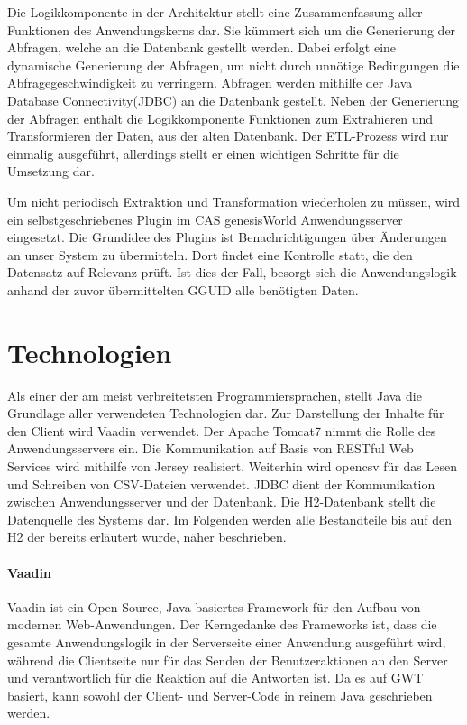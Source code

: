 Die Logikkomponente in der Architektur stellt eine Zusammenfassung aller Funktionen des Anwendungskerns dar. Sie kümmert sich um die Generierung der Abfragen, welche an die Datenbank gestellt werden. Dabei erfolgt eine dynamische Generierung der Abfragen, um nicht durch unnötige Bedingungen die Abfragegeschwindigkeit zu verringern. Abfragen werden mithilfe der Java Database Connectivity(JDBC) an die Datenbank gestellt. Neben der Generierung der Abfragen enthält die Logikkomponente Funktionen zum Extrahieren und Transformieren der Daten, aus der alten Datenbank. Der ETL-Prozess wird nur einmalig ausgeführt, allerdings stellt er einen wichtigen  Schritte für die Umsetzung dar. 

Um nicht periodisch Extraktion und Transformation wiederholen zu müssen, wird ein selbstgeschriebenes Plugin im CAS genesisWorld Anwendungsserver eingesetzt. Die Grundidee des Plugins ist Benachrichtigungen über Änderungen an unser System zu übermitteln. Dort findet eine Kontrolle statt, die den Datensatz auf Relevanz prüft. Ist dies der Fall, besorgt sich die Anwendungslogik anhand der zuvor übermittelten GGUID alle benötigten Daten.

\section{Technologien}

Als einer der am meist verbreitetsten Programmiersprachen, stellt Java die Grundlage aller verwendeten Technologien dar. Zur Darstellung der Inhalte für den Client wird Vaadin verwendet. Der Apache Tomcat7 nimmt die Rolle des Anwendungsservers ein. Die Kommunikation auf Basis von RESTful Web Services wird mithilfe von Jersey realisiert. Weiterhin wird opencsv für das Lesen und Schreiben von CSV-Dateien verwendet. JDBC dient der Kommunikation zwischen Anwendungsserver und der Datenbank. Die H2-Datenbank stellt die Datenquelle des Systems dar. Im Folgenden werden alle Bestandteile bis auf den H2 der bereits erläutert wurde, näher beschrieben. 

\paragraph{Vaadin}

Vaadin ist ein Open-Source, Java basiertes Framework für den Aufbau von modernen Web-Anwendungen. Der Kerngedanke des Frameworks ist, dass die gesamte Anwendungslogik in der Serverseite einer Anwendung ausgeführt wird, während die Clientseite nur für das Senden der Benutzeraktionen an den Server und verantwortlich für die Reaktion auf die Antworten ist. Da es auf GWT basiert, kann sowohl der Client- und Server-Code in reinem Java geschrieben werden.

